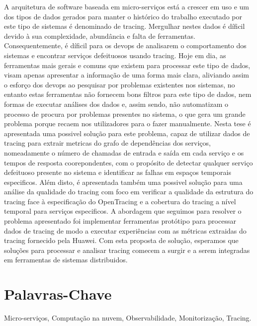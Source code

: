 A arquitetura de software baseada em micro-serviços está a crescer em uso e um dos tipos de dados gerados para manter o histórico do trabalho executado por este tipo de sistemas é denominado de tracing.
Mergulhar nestes dados é díficil devido à sua complexidade, abundância e falta de ferramentas. Consequentemente, é díficil para os \gls{devops} de analisarem o comportamento dos sistemas e encontrar serviços defeituosos usando tracing.
Hoje em dia, as ferramentas mais gerais e comuns que existem para processar este tipo de dados, visam apenas apresentar a informação de uma forma mais clara, aliviando assim o esforço dos \gls{devops} ao pesquisar por problemas existentes nos sistemas, no entanto estas ferramentas não fornecem bons filtros para este tipo de dados, nem formas de executar análises dos dados e, assim sendo, não automatizam o processo de procura por problemas presentes no sistema, o que gera um grande problema porque recaem nos utilizadores para o fazer manualmente.
Nesta tese é apresentada uma possivel solução para este problema, capaz de utilizar dados de tracing para extrair metricas do grafo de dependências dos serviços, nomeadamente o número de chamadas de entrada e saída em cada serviço e os tempos de resposta coorepondentes, com o propósito de detectar qualquer serviço defeituoso presente no sistema e identificar as falhas em espaços temporais especificos. Além disto, é apresentada também uma possivel solução para uma análise da qualidade do tracing com foco em verificar a qualidade da estrutura do tracing face à especificação do OpenTracing e a cobertura do tracing a nível temporal para serviços especificos.
A abordagem que seguimos para resolver o problema apresentado foi implementar ferramentas protótipo para processar dados de tracing de modo a executar experiências com as métricas extraidas do tracing fornecido pela Huawei.
Com esta proposta de solução, esperamos que soluções para processar e analisar tracing comecem a surgir e a serem integradas em ferramentas de sistemas distribuidos.

\section*{Palavras-Chave}
\label{sec:palavras}

Micro-serviços, Computação na nuvem, Observabilidade, Monitorização, Tracing.

\restoregeometry